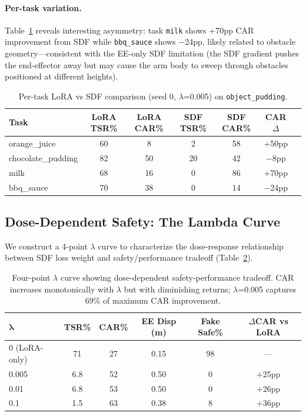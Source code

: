 \documentclass[letterpaper]{article}
\begin{document}
\paragraph{Per-task variation.} Table~\ref{tab:per_task_lora} reveals interesting asymmetry: task \texttt{milk} shows +70pp CAR improvement from SDF while \texttt{bbq\_sauce} shows $-$24pp, likely related to obstacle geometry---consistent with the EE-only SDF limitation (the SDF gradient pushes the end-effector away but may cause the arm body to sweep through obstacles positioned at different heights).

\begin{table}[h]
\centering
\caption{Per-task LoRA vs SDF comparison (seed 0, $\lambda$=0.005) on \texttt{object\_pudding}.}
\label{tab:per_task_lora}
\begin{tabular}{lcccccc}
\toprule
\textbf{Task} & \textbf{LoRA TSR\%} & \textbf{LoRA CAR\%} & \textbf{SDF TSR\%} & \textbf{SDF CAR\%} & \textbf{CAR $\Delta$} \\
\midrule
orange\_juice & 60 & 8 & 2 & 58 & +50pp \\
chocolate\_pudding & 82 & 50 & 20 & 42 & $-$8pp \\
milk & 68 & 16 & 0 & 86 & +70pp \\
bbq\_sauce & 70 & 38 & 0 & 14 & $-$24pp \\
\bottomrule
\end{tabular}
\end{table}

\subsection{Dose-Dependent Safety: The Lambda Curve}
\label{sec:lambda}

We construct a 4-point $\lambda$ curve to characterize the dose-response relationship between SDF loss weight and safety/performance tradeoff (Table~\ref{tab:lambda_curve}).

\begin{table}[h]
\centering
\caption{Four-point $\lambda$ curve showing dose-dependent safety-performance tradeoff. CAR increases monotonically with $\lambda$ but with diminishing returns; $\lambda$=0.005 captures 69\% of maximum CAR improvement.}
\label{tab:lambda_curve}
\begin{tabular}{lccccc}
\toprule
$\boldsymbol{\lambda}$ & \textbf{TSR\%} & \textbf{CAR\%} & \textbf{EE Disp (m)} & \textbf{Fake Safe\%} & \textbf{$\Delta$CAR vs LoRA} \\
\midrule
0 (LoRA-only) & 71 & 27 & 0.15 & 98 & --- \\
0.005 & 6.8 & 52 & 0.50 & 0 & +25pp \\
0.01 & 6.8 & 53 & 0.50 & 0 & +26pp \\
0.1 & 1.5 & 63 & 0.38 & 8 & +36pp \\
\bottomrule
\end{tabular}
\end{table}
\end{document}
